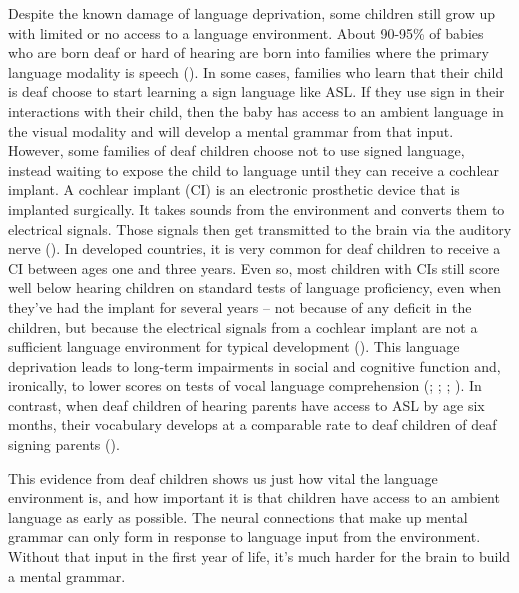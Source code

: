 \documentclass[
]{krantz}
\begin{document}
Despite the known damage of language deprivation, some children still grow up with limited or no access to a language environment. About 90-95\% of babies who are born deaf or hard of hearing are born into families where the primary language modality is speech (). In some cases, families who learn that their child is deaf choose to start learning a sign language like ASL. If they use sign in their interactions with their child, then the baby has access to an ambient language in the visual modality and will develop a mental grammar from that input. However, some families of deaf children choose not to use signed language, instead waiting to expose the child to language until they can receive a cochlear implant. A cochlear implant (CI) is an electronic prosthetic device that is implanted surgically. It takes sounds from the environment and converts them to electrical signals. Those signals then get transmitted to the brain via the auditory nerve (). In developed countries, it is very common for deaf children to receive a CI between ages one and three years. Even so, most children with CIs still score well below hearing children on standard tests of language proficiency, even when they've had the implant for several years -- not because of any deficit in the children, but because the electrical signals from a cochlear implant are not a sufficient language environment for typical development (). This language deprivation leads to long-term impairments in social and cognitive function and, ironically, to lower scores on tests of vocal language comprehension (; ; ; ). In contrast, when deaf children of hearing parents have access to ASL by age six months, their vocabulary develops at a comparable rate to deaf children of deaf signing parents ().

This evidence from deaf children shows us just how vital the language environment is, and how important it is that children have access to an ambient language as early as possible. The neural connections that make up mental grammar can only form in response to language input from the environment. Without that input in the first year of life, it's much harder for the brain to build a mental grammar.
\end{document}
